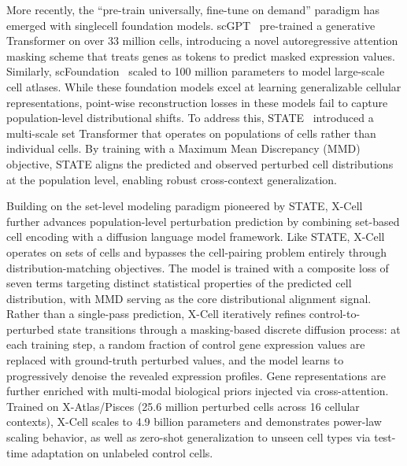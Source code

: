 \documentclass[11pt]{article}
\begin{document}
More recently, the “pre-train universally, fine-tune on demand” paradigm has emerged with singlecell foundation models. scGPT~\cite{cui2024scgpt} pre-trained a generative Transformer on over 33 million cells, introducing a novel autoregressive attention masking scheme that treats genes as tokens to predict masked expression values. Similarly, scFoundation~\cite{hao2024scfoundation} scaled to 100 million parameters to model large-scale cell atlases. While these foundation models excel at learning generalizable cellular representations, point-wise reconstruction losses in these models fail to capture population-level distributional shifts. To address this, STATE~\cite{adduri2025state} introduced a multi-scale set Transformer that operates on populations of cells rather than individual cells. By training with a Maximum Mean Discrepancy (MMD) objective, STATE aligns the predicted and observed perturbed cell distributions at the population level, enabling robust cross-context generalization.

Building on the set-level modeling paradigm pioneered by STATE, X-Cell~\cite{wang2026xcell} further advances population-level perturbation prediction by combining set-based cell encoding with a diffusion language model framework. Like STATE, X-Cell operates on sets of cells and bypasses the cell-pairing problem entirely through distribution-matching objectives. The model is trained with a composite loss of seven terms targeting distinct statistical properties of the predicted cell distribution, with MMD serving as the core distributional alignment signal. Rather than a single-pass prediction, X-Cell iteratively refines control-to-perturbed state transitions through a masking-based discrete diffusion process: at each training step, a random fraction of control gene expression values are replaced with ground-truth perturbed values, and the model learns to progressively denoise the revealed expression profiles. Gene representations are further enriched with multi-modal biological priors injected via cross-attention. Trained on X-Atlas/Pisces (25.6 million perturbed cells across 16 cellular contexts), X-Cell scales to 4.9 billion parameters and demonstrates power-law scaling behavior, as well as zero-shot generalization to unseen cell types via test-time adaptation on unlabeled control cells.
\end{document}
